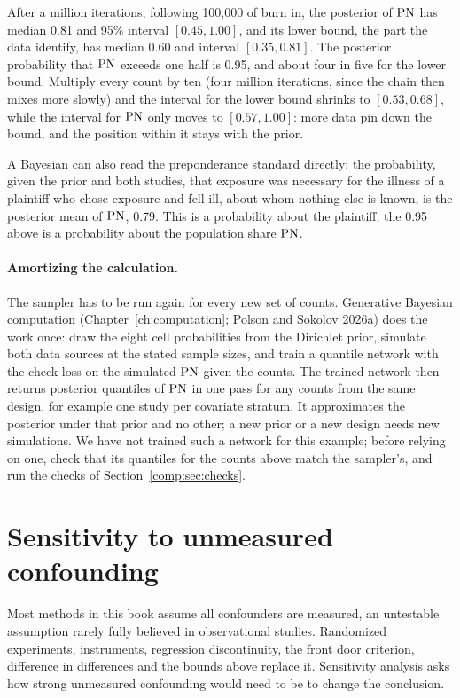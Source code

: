 After a million iterations, following 100,000 of burn in, the posterior of $\mathrm{PN}$ has median 0.81 and 95\% interval $[0.45, 1.00]$, and its lower bound, the part the data identify, has median 0.60 and interval $[0.35, 0.81]$. The posterior probability that $\mathrm{PN}$ exceeds one half is 0.95, and about four in five for the lower bound. Multiply every count by ten (four million iterations, since the chain then mixes more slowly) and the interval for the lower bound shrinks to $[0.53, 0.68]$, while the interval for $\mathrm{PN}$ only moves to $[0.57, 1.00]$: more data pin down the bound, and the position within it stays with the prior.

A Bayesian can also read the preponderance standard directly: the probability, given the prior and both studies, that exposure was necessary for the illness of a plaintiff who chose exposure and fell ill, about whom nothing else is known, is the posterior mean of $\mathrm{PN}$, 0.79. This is a probability about the plaintiff; the 0.95 above is a probability about the population share $\mathrm{PN}$.

\paragraph{Amortizing the calculation.} The sampler has to be run again for every new set of counts. Generative Bayesian computation (Chapter~\ref{ch:computation}; Polson and Sokolov 2026a) does the work once: draw the eight cell probabilities from the Dirichlet prior, simulate both data sources at the stated sample sizes, and train a quantile network with the check loss on the simulated $\mathrm{PN}$ given the counts. The trained network then returns posterior quantiles of $\mathrm{PN}$ in one pass for any counts from the same design, for example one study per covariate stratum. It approximates the posterior under that prior and no other; a new prior or a new design needs new simulations. We have not trained such a network for this example; before relying on one, check that its quantiles for the counts above match the sampler's, and run the checks of Section~\ref{comp:sec:checks}.

\section{Sensitivity to unmeasured confounding}\label{sec:sensitivity}

Most methods in this book assume all confounders are measured, an untestable assumption rarely fully believed in observational studies. Randomized experiments, instruments, regression discontinuity, the front door criterion, difference in differences and the bounds above replace it. Sensitivity analysis asks how strong unmeasured confounding would need to be to change the conclusion.

